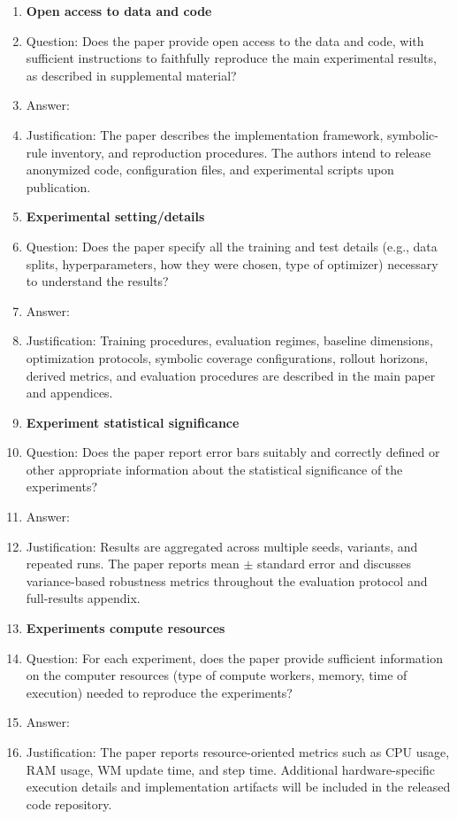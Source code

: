 \begin{enumerate}
      \item {\bf Open access to data and code}
      \item[] Question: Does the paper provide open access to the data and code, with sufficient instructions to faithfully reproduce the main experimental results, as described in supplemental material?
      \item[] Answer: \answerYes{}
      \item[] Justification: The paper describes the implementation framework, symbolic-rule inventory, and reproduction procedures. The authors intend to release anonymized code, configuration files, and experimental scripts upon publication.

      \item {\bf Experimental setting/details}
      \item[] Question: Does the paper specify all the training and test details (e.g., data splits, hyperparameters, how they were chosen, type of optimizer) necessary to understand the results?
      \item[] Answer: \answerYes{}
      \item[] Justification: Training procedures, evaluation regimes, baseline dimensions, optimization protocols, symbolic coverage configurations, rollout horizons, derived metrics, and evaluation procedures are described in the main paper and appendices.

      \item {\bf Experiment statistical significance}
      \item[] Question: Does the paper report error bars suitably and correctly defined or other appropriate information about the statistical significance of the experiments?
      \item[] Answer: \answerYes{}
      \item[] Justification: Results are aggregated across multiple seeds, variants, and repeated runs. The paper reports mean $\pm$ standard error and discusses variance-based robustness metrics throughout the evaluation protocol and full-results appendix.

      \item {\bf Experiments compute resources}
      \item[] Question: For each experiment, does the paper provide sufficient information on the computer resources (type of compute workers, memory, time of execution) needed to reproduce the experiments?
      \item[] Answer: \answerYes{}
      \item[] Justification: The paper reports resource-oriented metrics such as CPU usage, RAM usage, WM update time, and step time. Additional hardware-specific execution details and implementation artifacts will be included in the released code repository.


\end{enumerate}
